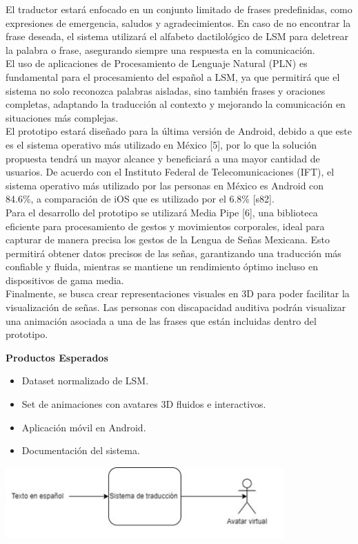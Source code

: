 El traductor estará enfocado en un conjunto limitado de frases predefinidas, como expresiones de emergencia, saludos y agradecimientos. En caso de no encontrar la frase deseada, el sistema utilizará el alfabeto dactilológico de LSM para deletrear la palabra o frase, asegurando siempre una respuesta en la comunicación.\\

El uso de aplicaciones de Procesamiento de Lenguaje Natural (PLN) es fundamental para el procesamiento del español a LSM, ya que permitirá que el sistema no solo reconozca palabras aisladas, sino también frases y oraciones completas, adaptando la traducción al contexto y mejorando la comunicación en situaciones más complejas.\\

El prototipo estará diseñado para la última versión de Android, debido a que este es el sistema operativo más utilizado en México [5], por lo que la solución propuesta tendrá un mayor alcance y beneficiará a una mayor cantidad de usuarios. De acuerdo con el Instituto Federal de Telecomunicaciones (IFT), el sistema operativo más utilizado por las personas en México es Android con 84.6\%, a comparación de iOS que es utilizado por el 6.8\% [s82].\\

Para el desarrollo del prototipo se utilizará Media Pipe [6], una biblioteca eficiente para procesamiento de gestos y movimientos corporales, ideal para capturar de manera precisa los gestos de la Lengua de Señas Mexicana. Esto permitirá obtener datos precisos de las señas, garantizando una traducción más confiable y fluida, mientras se mantiene un rendimiento óptimo incluso en dispositivos de gama media.\\

Finalmente, se busca crear representaciones visuales en 3D para poder facilitar la visualización de señas. Las personas con discapacidad auditiva podrán visualizar una animación asociada a una de las frases que están incluidas dentro del prototipo.
\newline

\textbf{Productos Esperados}
\begin{itemize}
    \item Dataset normalizado de LSM.
    \item Set de animaciones con avatares 3D fluidos e interactivos.
    \item Aplicación móvil en Android.
    \item Documentación del sistema.
\end{itemize}
\begin{center}
    \includegraphics[width=0.8\textwidth]{Images/Cap 1/diacajanegra.jpg}
\end{center}


